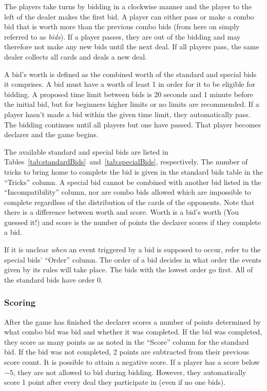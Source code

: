 \documentclass[a4paper]{article}
\begin{document}
				The players take turns by bidding in a clockwise manner and the player to the left of the dealer makes the first bid. A player can either pass or make a combo bid that is worth more than the previous combo bids (from here on simply referred to as \emph{bids}). If a player passes, they are out of the bidding and may therefore not make any new bids until the next deal. If all players pass, the same dealer collects all cards and deals a new deal.

				A bid's worth is defined as the combined worth of the standard and special bids it comprises. A bid must have a worth of least 1 in order for it to be eligible for bidding. A proposed time limit between bids is 20 seconds and 1 minute before the initial bid, but for beginners higher limits or no limits are recommended. If a player hasn't made a bid within the given time limit, they automatically pass. The bidding continues until all players but one have passed. That player becomes declarer and the game begins.

				The available standard and special bids are listed in Tables~\ref{tab:standardBids}~and~\ref{tab:specialBids}, respectively. The number of tricks to bring home to complete the bid is given in the standard bids table in the ``Tricks'' column. A special bid cannot be combined with another bid listed in the ``Incompatibility'' column, nor are combo bids allowed which are impossible to complete regardless of the distribution of the cards of the opponents. Note that there is a difference between worth and score. Worth is a bid's worth (You guessed it!) and score is the number of points the declarer scores if they complete a bid.

				If it is unclear \emph{when} an event triggered by a bid is supposed to occur, refer to the special bids' ``Order'' column. The order of a bid decides in what order the events given by its rules will take place. The bids with the lowest order go first. All of the standard bids have order 0.

			\subsubsection{Scoring}
				After the game has finished the declarer scores a number of points determined by what combo bid was bid and whether it was completed. If the bid was completed, they score as many points as as noted in the ``Score'' column for the standard bid. If the bid was not completed, 2 points are subtracted from their previous score count. It is possible to attain a negative score. If a player has a score below $-5$, they are not allowed to bid during bidding. However, they automatically score 1 point after every deal they participate in (even if no one bids).
\end{document}
